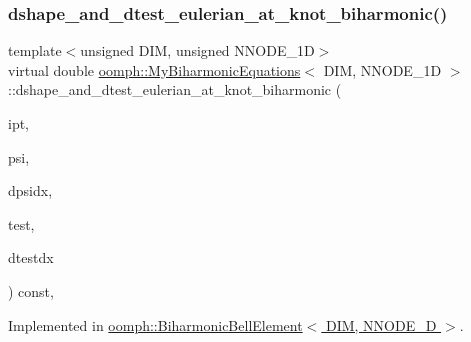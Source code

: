 \subsubsection{\texorpdfstring{dshape\+\_\+and\+\_\+dtest\+\_\+eulerian\+\_\+at\+\_\+knot\+\_\+biharmonic()}{dshape\_and\_dtest\_eulerian\_at\_knot\_biharmonic()}}
{\footnotesize\ttfamily template$<$unsigned D\+IM, unsigned N\+N\+O\+D\+E\+\_\+1D$>$ \\
virtual double \hyperlink{classoomph_1_1MyBiharmonicEquations}{oomph\+::\+My\+Biharmonic\+Equations}$<$ D\+IM, N\+N\+O\+D\+E\+\_\+1D $>$\+::dshape\+\_\+and\+\_\+dtest\+\_\+eulerian\+\_\+at\+\_\+knot\+\_\+biharmonic (\begin{DoxyParamCaption}\item[{const unsigned \&}]{ipt,  }\item[{Shape \&}]{psi,  }\item[{D\+Shape \&}]{dpsidx,  }\item[{Shape \&}]{test,  }\item[{D\+Shape \&}]{dtestdx }\end{DoxyParamCaption}) const\hspace{0.3cm}{\ttfamily [protected]}, {}}



Implemented in \hyperlink{classoomph_1_1BiharmonicBellElement_ab15a039def500f435638bed6f02edbcb}{oomph\+::\+Biharmonic\+Bell\+Element$<$ D\+I\+M, N\+N\+O\+D\+E\+\_\+D $>$}.

\mbox{\label{classoomph_1_1MyBiharmonicEquations_a084eaadd62185dad622c7708862f023a}} 
